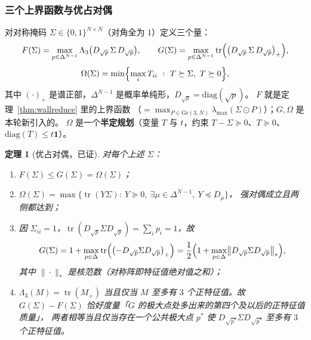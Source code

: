 \documentclass[UTF8,11pt]{ctexart}
\newtheorem{theorem}{定理}[section]
\theoremstyle{definition}
\newcommand{\Lam}{\Lambda}
\newcommand{\tr}{\operatorname{tr}}
\newcommand{\one}{\mathbf{1}}
\begin{document}
\subsubsection*{三个上界函数与优占对偶}

对对称掩码 $\Sigma\in\{0,1\}^{N\times N}$（对角全为 $1$）定义三个量：
\[
F(\Sigma)=\max_{p\in\Delta^{N-1}}\Lam_3\bigl(D_{\sqrt p}\,\Sigma\,D_{\sqrt p}\bigr),\qquad
G(\Sigma)=\max_{p\in\Delta^{N-1}}\tr\Bigl(\bigl(D_{\sqrt p}\,\Sigma\,D_{\sqrt p}\bigr)_+\Bigr),
\]
\[
\Omega(\Sigma)=\min\Bigl\{\max_iT_{ii}\ :\ T\succeq\Sigma,\ T\succeq0\Bigr\},
\]
其中 $(\cdot)_+$ 是谱正部，$\Delta^{N-1}$ 是概率单纯形，$D_{\sqrt p}=\mathrm{diag}(\sqrt p)$。
$F$ 就是定理~\ref{thm:wallreduce} 里的上界函数
（$=\max_{P\in\mathrm{Gr}(3,N)}\lambda_{\max}(\Sigma\odot P)$）；$G,\Omega$ 是本轮新引入的。
$\Omega$ 是一个\textbf{半定规划}（变量 $T$ 与 $t$，约束 $T-\Sigma\succeq0$、$T\succeq0$、$\mathrm{diag}(T)\le t\one$）。

\begin{theorem}[优占对偶，已证]\label{thm:domdual}
对每个上述 $\Sigma$：
\begin{enumerate}[label=(\roman*),leftmargin=2em,itemsep=1pt]
\item $F(\Sigma)\le G(\Sigma)=\Omega(\Sigma)$；
\item $\Omega(\Sigma)=\max\bigl\{\tr(Y\Sigma):\ Y\succeq0,\ \exists\mu\in\Delta^{N-1},\ Y\preceq D_\mu\bigr\}$，
      强对偶成立且两侧都达到；
\item 因 $\Sigma_{ii}=1$，$\tr(D_{\sqrt p}\Sigma D_{\sqrt p})=\sum_ip_i=1$，故
      \[
      G(\Sigma)=1+\max_{p\in\Delta}\tr\Bigl(\bigl(-D_{\sqrt p}\Sigma D_{\sqrt p}\bigr)_+\Bigr)
               =\frac12\Bigl(1+\max_{p\in\Delta}\bigl\|D_{\sqrt p}\Sigma D_{\sqrt p}\bigr\|_*\Bigr),
      \]
      其中 $\|\cdot\|_*$ 是核范数（对称阵即特征值绝对值之和）；
\item $\Lam_3(M)=\tr(M_+)$ 当且仅当 $M$ 至多有 $3$ 个正特征值。故 $G(\Sigma)-F(\Sigma)$
      恰好度量「$G$ 的极大点处多出来的第四个及以后的正特征值质量」，
      两者相等当且仅当存在一个公共极大点 $p^*$ 使 $D_{\sqrt{p^*}}\Sigma D_{\sqrt{p^*}}$ 至多有 $3$ 个正特征值。
\end{enumerate}
\end{theorem}
\end{document}
